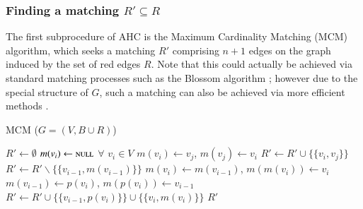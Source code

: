 \documentclass[a4paper,11pt,authoryear]{elsarticle}
\begin{document}
\subsubsection{Finding a matching $R' \subseteq R$}
\label{subsub:mcm}
\noindent The first subprocedure of AHC is the Maximum Cardinality Matching (MCM) algorithm, which seeks a matching $R'$ comprising $n+1$ edges on the graph induced by the set of red edges $R$. Note that this could actually be achieved via standard matching processes such as the Blossom algorithm \cite{edmonds1965}; however due to the special structure of $G$, such a matching can also be achieved via more efficient methods \cite{mahadev1994, becker2015}.

\begin{algorithm}[H]
\caption{MCM ($G = (V, B \cup R)$)}
\begin{algorithmic}[1]
	\State $R' \gets \emptyset$
	\State $m(v_i) \gets \textsc{null}$ $\forall$ $v_i \in V$
				\State $m(v_i) \gets v_j$, $m(v_j) \gets v_i$
				\State $R' \gets R' \cup \{\{v_i, v_j\}\}$
				\Break
			\EndIf
		\EndFor
			\State $R' \gets R' \backslash \{\{v_{i-1}, m(v_{i-1})\}\}$
			\State $m(v_i) \gets m(v_{i-1})$, $m(m(v_i)) \gets v_i$
			\State $m(v_{i-1}) \gets p(v_i)$, $m(p(v_i)) \gets v_{i-1}$
			\State $R' \gets R' \cup \{\{v_{i-1}, p(v_i)\}\} \cup \{\{v_i, m(v_i)\}\}$
		\EndIf
	\EndFor
	\Return $R'$
\end{algorithmic}
\label{alg:mcm}	
\end{algorithm}

\end{document}
